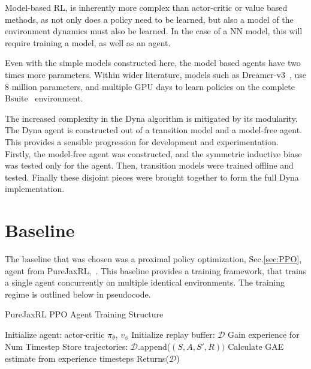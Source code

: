 Model-based RL, is inherently more complex than actor-critic or value based methods, as not only does a policy need to be learned, but also a model of the environment dynamics must also be learned. In the case of a NN model, this will require training a model, as well as an agent.

Even with the simple models constructed here, the model based agents have two times more parameters. Within wider literature, models such as Dreamer-v3~\cite{hafner2023mastering}, use 8 million parameters, and multiple GPU days to learn policies on the complete Bsuite~\cite{osband2020bsuite} environment.

The increased complexity in the Dyna algorithm is mitigated by its modularity. The Dyna agent is constructed out of a transition model and a model-free agent. This provides a sensible progression for development and experimentation. Firstly, the model-free agent was constructed, and the symmetric inductive biase was tested only for the agent. Then, transition models were trained offline and tested. Finally these disjoint pieces were brought together to form the full Dyna implementation.

\section{Baseline}\label{sec:baseline}
The baseline that was chosen was a proximal policy optimization, Sec.\ref{sec:PPO}, agent from PureJaxRL,~\cite{lu2022discovered, schulman2015highdimensional}. This baseline provides a training framework, that trains a single agent concurrently on multiple identical environments. The training regime is outlined below in pseudocode.
\begin{algorithm}
	\caption{PureJaxRL PPO Agent Training Structure}
	\begin{algorithmic}
		\State Initialize agent: actor-critic $\pi_\theta$, $v_\phi$
		\State Initialize replay buffer: $\mathcal{D}$
		\State Gain experience for Num Timestep
		\State Store trajectories: $\mathcal{D}$.append($(S, A, S', R))$
		\State Calculate GAE estimate from experience timesteps
		\EndFor
		\EndFor
		\State Returns($\mathcal{D}$)

	\end{algorithmic}
\end{algorithm}

